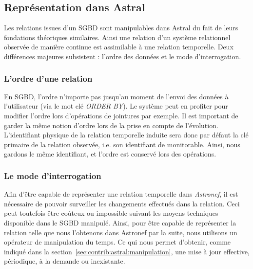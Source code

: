 \subsection{Représentation dans Astral}
Les relations issues d'un SGBD sont manipulables dans Astral du fait de leurs fondations théoriques similaires. Ainsi une relation d'un système relationnel observée de manière continue est assimilable à une relation temporelle. Deux différences majeures subsistent : l'ordre des données et le mode d'interrogation.
\subsubsection{L'ordre d'une relation}
En SGBD, l'ordre n'importe pas jusqu'au moment de l'envoi des données à l'utilisateur (via le mot clé \textit{ORDER BY}). Le système peut en profiter pour modifier l'ordre lors d'opérations de jointures par exemple. Il est important de garder la même notion d'ordre lors de la prise en compte de l'évolution. L'identifiant physique de la relation temporelle induite sera donc par défaut la clé primaire de la relation observée, i.e. son identifiant de monitorable. Ainsi, nous gardons le même identifiant, et l'ordre est conservé lors des opérations.

\subsubsection{Le mode d'interrogation}
Afin d'être capable de représenter une relation temporelle dans \textit{Astronef}, il est nécessaire de pouvoir surveiller les changements effectués dans la relation. Ceci peut toutefois être coûteux ou impossible suivant les moyens techniques disponible dans le SGBD manipulé. Ainsi, pour être capable de représenter la relation telle que nous l'obtenons dans Astronef par la suite, nous utilisons un opérateur de manipulation du temps. Ce qui nous permet d'obtenir, comme indiqué dans la section~\ref{sec:contrib:astral:manipulation}, une mise à jour effective, périodique, à la demande ou inexistante.